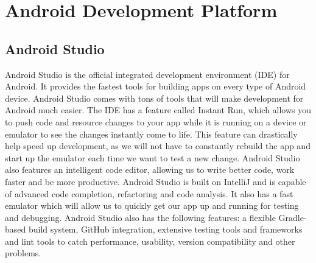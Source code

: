 \documentclass[letterpaper,10pt,draftclsnofoot,onecolumn,titlepage]{IEEEtran}
\begin{document}
	\section{Android Development Platform}
		\subsection{Android Studio}
			Android Studio is the official integrated development environment (IDE) for Android. \cite{AndroidStudio}
			It provides the fastest tools for building apps on every type of Android device.
			Android Studio comes with tons of tools that will make development for Android much easier.
			The IDE has a feature called Instant Run, which allows you to push code and resource changes to your app while it is running on a device or emulator to see the changes instantly come to life.
			This feature can drastically help speed up development, as we will not have to constantly rebuild the app and start up the emulator each time we want to test a new change.
			Android Studio also features an intelligent code editor, allowing us to write better code, work faster and be more productive.
			Android Studio is built on IntelliJ and is capable of advanced code completion, refactoring and code analysis.
			It also has a fast emulator which will allow us to quickly get our app up and running for testing and debugging.
			Android Studio also has the following features: a flexible Gradle-based build system, GitHub integration, extensive testing tools and frameworks and lint tools to catch performance, usability, version compatibility and other problems.
\end{document}
